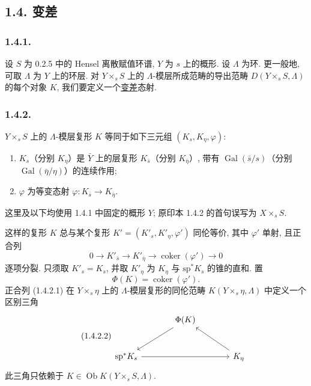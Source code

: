 \subsection*{1.4. 变差}

\subsubsection*{1.4.1.}
设 $S$ 为 0.2.5 中的 Hensel 离散赋值环谱, $Y$ 为 $s$ 上的概形. 设 $\Lambda$ 为环. 更一般地, 可取 $\Lambda$ 为 $Y$ 上的环层. 对 $Y\times_sS$ 上的 $\Lambda$-模层所成范畴的导出范畴 $D(Y\times_sS,\Lambda)$ 的每个对象 $K$, 我们要定义一个\underline{变差}态射.

\subsubsection*{1.4.2.}
$Y\times_sS$ 上的 $\Lambda$-模层复形 $K$ 等同于如下三元组 $(K_s,K_\eta,\varphi)$:
\begin{enumerate}[label=\alph*)]
\item $K_s$（分别 $K_\eta$）是 $\bar Y$ 上的层复形 $K_{\bar s}$（分别 $K_{\bar\eta}$）, 带有 $\operatorname{Gal}(\bar s/s)$（分别 $\operatorname{Gal}(\bar\eta/\eta)$）的连续作用;

\item $\varphi$ 为等变态射 $\varphi:K_{\bar s}\longrightarrow K_{\bar\eta}$.
\end{enumerate}
这里及以下均使用 1.4.1 中固定的概形 $Y$; 原印本 1.4.2 的首句误写为 $X\times_sS$.

这样的复形 $K$ 总与某个复形 $K'=(K'_s,K'_\eta,\varphi')$ 同伦等价, 其中 $\varphi'$ 单射, 且正合列
\begin{equation}\tag{1.4.2.1}
0\longrightarrow K'_{\bar s}
\longrightarrow K'_{\bar\eta}
\longrightarrow\operatorname{coker}(\varphi')
\longrightarrow0
\end{equation}
逐项分裂. 只须取 $K'_s=K_s$, 并取 $K'_\eta$ 为 $K_\eta$ 与 $\mathrm{sp}^*K_s$ 的锥的直和. 置
\begin{equation*}
\Phi(K)=\operatorname{coker}(\varphi').
\end{equation*}
正合列 (1.4.2.1) 在 $Y\times_s\eta$ 上的 $\Lambda$-模层复形的同伦范畴 $K(Y\times_s\eta,\Lambda)$ 中定义一个区别三角
\begin{equation}\tag{1.4.2.2}
\begin{tikzcd}[column sep=large, row sep=large]
{} & \Phi(K) \arrow[dl] & {} \\
\mathrm{sp}^*K_s \arrow[rr] & {} & K_\eta \arrow[ul]
\end{tikzcd}
\end{equation}
此三角只依赖于 $K\in\operatorname{Ob}K(Y\times_sS,\Lambda)$.

